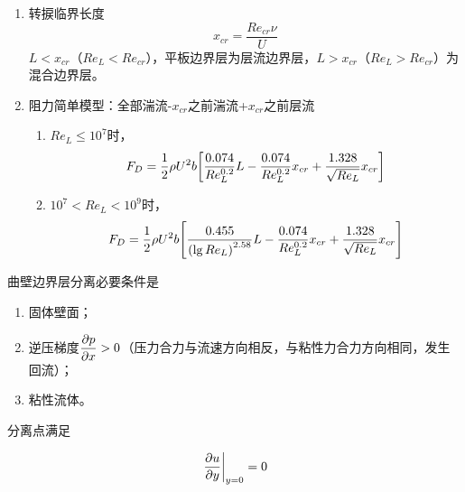 
\begin{enumerate}
	\item 转捩临界长度
	\begin{equation}
		x_{cr} = \dfrac{Re_{cr} \nu}{U}
	\end{equation}
    $L < x_{cr}$（$Re_L < Re_{cr}$），平板边界层为层流边界层，$L > x_{cr}$（$Re_L > Re_{cr}$）为混合边界层。
    \item 阻力简单模型：全部湍流-$x_{cr}$之前湍流+$x_{cr}$之前层流
    \begin{enumerate}
    	\item $Re_L \leq 10^7$时，
    	\begin{equation}
    		F_D = \dfrac{1}{2} \rho U^2 b \qty[\dfrac{0.074}{Re_L^{0.2}} L - \dfrac{0.074}{Re_L^{0.2}} x_{cr} + \dfrac{1.328}{\sqrt{Re_L}} x_{cr}]
    	\end{equation}
    	\item $10^7 < Re_L < 10^9$时，
    	\begin{equation}
    		F_D = \dfrac{1}{2} \rho U^2 b \qty[\dfrac{0.455}{\qty(\lg Re_L)^{2.58}} L - \dfrac{0.074}{Re_L^{0.2}} x_{cr} + \dfrac{1.328}{\sqrt{Re_L}} x_{cr}]
    	\end{equation}
    \end{enumerate}
\end{enumerate}


曲壁边界层分离必要条件是

\begin{enumerate}
	\item 固体壁面；
	\item 逆压梯度$\displaystyle \pdv{p}{x} > 0$（压力合力与流速方向相反，与粘性力合力方向相同，发生回流）；
	\item 粘性流体。
\end{enumerate}

分离点满足

\begin{equation}
	\eval{\pdv{u}{y}}_{y = 0} = 0
\end{equation}


